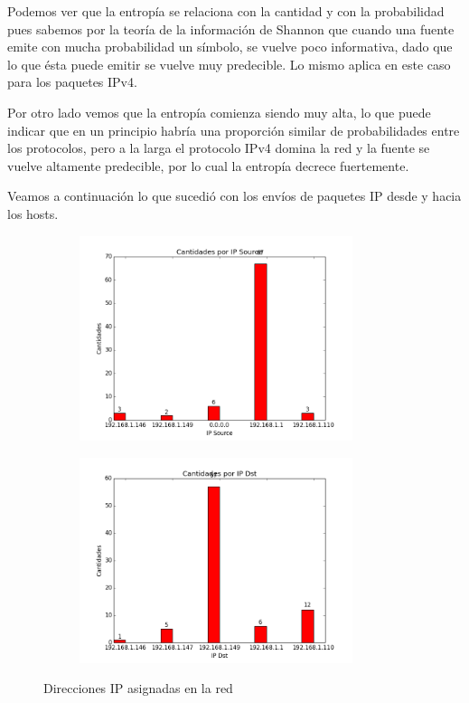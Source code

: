 Podemos ver que la entrop\'ia se relaciona con la cantidad y con la probabilidad pues sabemos por la teor\'ia de la informaci\'on de Shannon que cuando una fuente emite con mucha probabilidad un s\'imbolo, se vuelve poco informativa, dado que lo que \'esta puede emitir se vuelve muy predecible. Lo mismo aplica en este caso para los paquetes IPv4.\newline

Por otro lado vemos que la entrop\'ia comienza siendo muy alta, lo que puede indicar que en un principio habr\'ia una proporci\'on similar de probabilidades entre los protocolos, pero a la larga el protocolo IPv4 domina la red y la fuente se vuelve altamente predecible, por lo cual la entrop\'ia decrece fuertemente.\newline


Veamos a continuaci\'on lo que sucedi\'o con los env\'ios de paquetes IP desde y hacia los hosts.




\begin{figure}[H]

\begin{subfigure}{0.6\textwidth}
\includegraphics[width=0.9\linewidth, height=6cm]{imagenes/exp1/4cantidadIPSource}
\caption{}
\end{subfigure}
\begin{subfigure}{0.6\textwidth}
\includegraphics[width=0.9\linewidth, height=6cm]{imagenes/exp1/5cantidadIPDst}
\caption{}
\end{subfigure}

\caption{Direcciones IP asignadas en la red}
\label{fig:1}
\end{figure}

